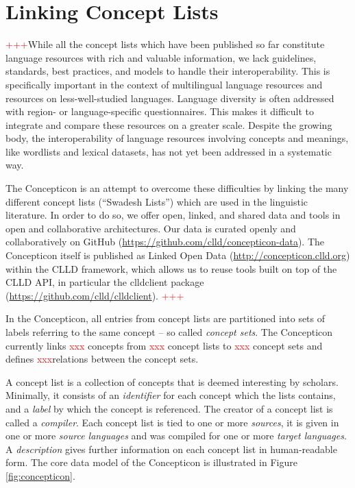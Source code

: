 \documentclass[10pt, a4paper]{article}
\newcommand{\conceptnumber}{\textcolor{red}{xxx} }
\newcommand{\listnumber}{\textcolor{red}{xxx} }
\newcommand{\setnumber}{\textcolor{red}{xxx} }
\newcommand{\relationnumber}{\textcolor{red}{xxx}}
\begin{document}
\section{Linking Concept Lists}
\textcolor{red}{+++}While all the concept lists which have been published so far constitute language
resources with rich and valuable information, we lack guidelines, standards, best practices, and
models to handle their interoperability. This is specifically important in the context of
multilingual language resources and resources on less-well-studied languages. 
Language diversity is often addressed with region- or
language-specific questionnaires. This makes it difficult to integrate and compare these resources
on a greater scale. Despite the growing body, the interoperability of language resources involving
concepts and meanings, like wordlists and lexical datasets, has not yet been addressed in a
systematic way.  
 
The Concepticon is an attempt to overcome these difficulties by linking 
the many different concept lists (``Swadesh Lists'') which are
used in the linguistic literature. 
In order to do so, we offer open, linked, and shared data and tools in open and collaborative
architectures. Our data is curated openly and collaboratively on GitHub (\url{https://github.com/clld/concepticon-data}). The
Concepticon itself is published as Linked Open Data (\url{http://concepticon.clld.org}) within the
CLLD framework, which allows us to reuse tools built on top of the CLLD API, in particular the
clldclient package (\url{https://github.com/clld/clldclient}). \textcolor{red}{+++}


In the Concepticon, all entries from concept lists are partitioned into sets
of labels referring to the same concept -- so called \emph{concept sets}. The Concepticon currently links
\conceptnumber concepts from \listnumber concept lists to \setnumber concept sets and defines
\relationnumber relations between the concept sets.
 
A concept list is a collection of concepts that is deemed interesting by scholars. Minimally, it
consists of an \emph{identifier} for each concept which the lists contains, and a \emph{label} by
which the concept is referenced. The creator of a concept list is called a \emph{compiler}. Each
concept list is tied to one or more \emph{sources}, it is given in one or more \emph{source
languages} and was compiled for one or more \emph{target languages}. A \emph{description} gives
further information on each concept list in human-readable form. The core
data model of the Concepticon is illustrated in Figure \ref{fig:concepticon}.
 
\end{document}
